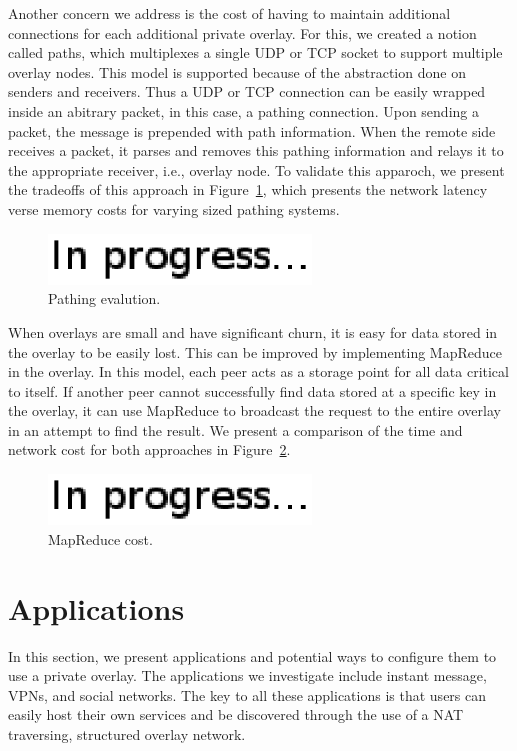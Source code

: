 \documentclass[conference]{IEEEtran}
\begin{document}
Another concern we address is the cost of having to maintain additional
connections for each additional private overlay.  For this, we created a notion
called paths, which multiplexes a single UDP or TCP socket to support multiple
overlay nodes.  This model is supported because of the abstraction done on
senders and receivers.  Thus a UDP or TCP connection can be easily wrapped 
inside an abitrary packet, in this case, a pathing connection.  Upon sending
a packet, the message is prepended with path information.  When the remote side
receives a packet, it parses and removes this pathing information and relays it
to the appropriate receiver, i.e., overlay node.  To validate this apparoch, we
present the tradeoffs of this approach in Figure~\ref{fig:pathing_eval}, which
presents the network latency verse memory costs for varying sized pathing systems.

\begin{figure}[h]
\centering
\includegraphics[width=2.75in]{in_progress.eps}
\caption{Pathing evalution.}
\label{fig:pathing_eval}
\end{figure}

When overlays are small and have significant churn, it is easy for data stored
in the overlay to be easily lost.  This can be improved by implementing
MapReduce~\cite{mapreduce} in the overlay.  In this model, each peer acts as a
storage point for all data critical to itself.  If another peer cannot
successfully find data stored at a specific key in the overlay, it can use
MapReduce to broadcast the request to the entire overlay in an attempt to find
the result.  We present a comparison of the time and network cost for both
approaches in Figure~\ref{fig:mapreduce_cost}.

\begin{figure}[h]
\centering
\includegraphics[width=2.75in]{in_progress.eps}
\caption{MapReduce cost.}
\label{fig:mapreduce_cost}
\end{figure}

\section{Applications}
\label{applications}
In this section, we present applications and potential ways to configure them
to use a private overlay.  The applications we investigate include instant
message, VPNs, and social networks.  The key to all these applications is that
users can easily host their own services and be discovered through the use of
a NAT traversing, structured overlay network.
\end{document}
